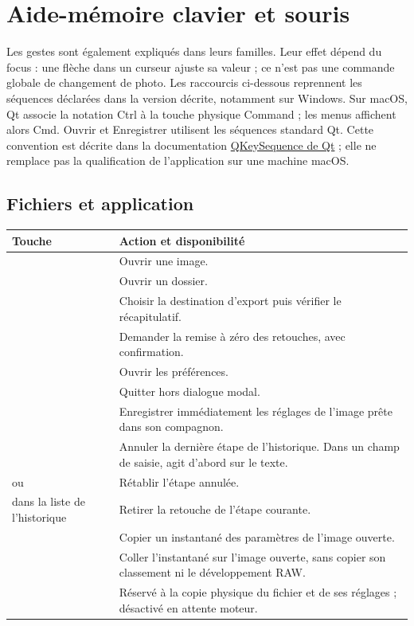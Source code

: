 \chapter{Aide-mémoire clavier et souris}
\label{chap:raccourcis}
Les gestes sont également expliqués dans leurs familles. Leur effet dépend
du focus : une flèche dans un curseur ajuste sa valeur ; ce n’est pas une
commande globale de changement de photo. Les raccourcis ci-dessous reprennent
les séquences déclarées dans la version décrite, notamment sur Windows.
Sur macOS, Qt associe la notation Ctrl à la touche physique Command ; les
menus affichent alors Cmd. Ouvrir et Enregistrer utilisent les séquences
standard Qt. Cette convention est décrite dans la documentation
\href{https://doc.qt.io/qt-6/qkeysequence.html}{QKeySequence de Qt} ; elle
ne remplace pas la qualification de l’application sur une machine macOS.

\clearpage
\section*{Fichiers et application}
\begin{longtable}{@{}L{4.4cm}L{9.2cm}@{}}
\toprule Touche & Action et disponibilité\\\midrule\endhead
{} & Ouvrir une image.\\
 & Ouvrir un dossier.\\
 & Choisir la destination d’export puis vérifier le récapitulatif.\\
 & Demander la remise à zéro des retouches, avec confirmation.\\
 & Ouvrir les préférences.\\
 & Quitter hors dialogue modal.\\
 & Enregistrer immédiatement les réglages de l’image prête dans son compagnon.\\
 & Annuler la dernière étape de l’historique. Dans un champ de saisie, agit d’abord sur le texte.\\
 ou  & Rétablir l’étape annulée.\\
 dans la liste de l’historique & Retirer la retouche de l’étape courante.\\
 & Copier un instantané des paramètres de l’image ouverte.\\
 & Coller l’instantané sur l’image ouverte, sans copier son classement ni le développement RAW.\\
 & Réservé à la copie physique du fichier et de ses réglages ; désactivé en attente moteur.\\
\bottomrule
\end{longtable}

